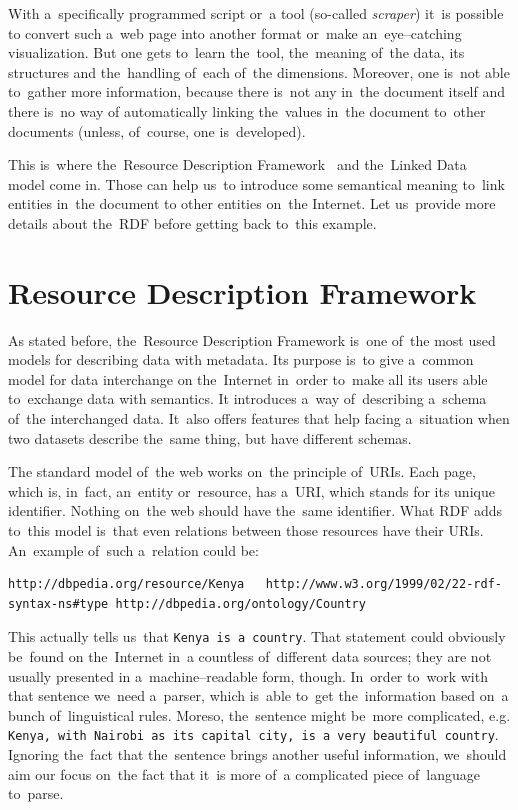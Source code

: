 With a~specifically programmed script or~a tool (so-called \emph{scraper}) it~is possible to
convert such a~web page into another format or~make an~eye--catching visualization.
But one gets to~learn the~tool, the~meaning of~the data, its structures and the~handling of~each of~the dimensions. Moreover, one is~not able to~gather more information,
because there is~not any in~the document itself and there is~no way of
automatically linking the~values in~the document to~other documents (unless, of~course,
one is~developed).

This is~where the~Resource Description Framework~\cite{rdf} and the~Linked Data~\cite{ld}
model come in. Those
can help us~to introduce some semantical meaning to~link entities in~the document to
other entities on~the Internet. Let us~provide more details about the~RDF before getting
back to~this example.

\section{Resource Description Framework}
As stated before, the~Resource Description Framework is~one of~the most used models for
describing data with metadata. Its purpose is~to give a~common model for data interchange
on the~Internet in~order to~make all its users able to~exchange data with semantics.
It introduces a~way of~describing a~schema of~the interchanged data. It~also 
offers features that help facing a~situation when two datasets describe the~same thing,
but have different schemas.

The standard model of~the web works on~the principle of~URIs. Each page, which is, in~fact,
an~entity or~resource, has a~URI, which stands for its unique identifier. Nothing on~the web
should have the~same identifier. What RDF adds to~this model is~that even relations
between those resources have their URIs. An~example of~such a~relation could be:

\tiny\begin{verbatim}
http://dbpedia.org/resource/Kenya   http://www.w3.org/1999/02/22-rdf-syntax-ns#type http://dbpedia.org/ontology/Country  
\end{verbatim}\normalsize

This actually tells us~that \texttt{Kenya is~a country}. That statement could obviously be~found on
the~Internet in~a countless of~different data sources; they are not usually presented
in a~machine--readable form, though. In~order to~work with that sentence we~need a~parser, which is~able to~get the~information based on~a bunch of~linguistical rules.
Moreso, the~sentence might be~more complicated, e.g. \texttt{Kenya, with Nairobi as~its capital city,
is a~very beautiful country}. Ignoring the~fact that the~sentence brings another useful
information, we~should aim our focus on~the fact that it~is more of~a complicated piece of~language to~parse. 

